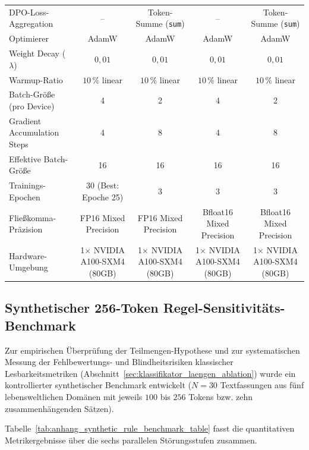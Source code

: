 \begin{table}[htbp]
{\begin{tabular}{@{}lcccc@{}}
DPO-Loss-Aggregation & -- & Token-Summe (\texttt{sum}) & -- & Token-Summe (\texttt{sum}) \\
Optimierer & AdamW & AdamW & AdamW & AdamW \\
Weight Decay ($\lambda$) & $0{,}01$ & $0{,}01$ & $0{,}01$ & $0{,}01$ \\
Warmup-Ratio & $10\,\%$ linear & $10\,\%$ linear & $10\,\%$ linear & $10\,\%$ linear \\
Batch-Größe (pro Device) & 4 & 2 & 4 & 2 \\
Gradient Accumulation Steps & 4 & 8 & 4 & 8 \\
Effektive Batch-Größe & 16 & 16 & 16 & 16 \\
Trainings-Epochen & 30 (Best: Epoche 25) & 3 & 3 & 3 \\
Fließkomma-Präzision & FP16 Mixed Precision & FP16 Mixed Precision & Bfloat16 Mixed Precision & Bfloat16 Mixed Precision \\
Hardware-Umgebung & 1$\times$ NVIDIA A100-SXM4 (80GB) & 1$\times$ NVIDIA A100-SXM4 (80GB) & 1$\times$ NVIDIA A100-SXM4 (80GB) & 1$\times$ NVIDIA A100-SXM4 (80GB) \\
\bottomrule
\end{tabular}}
\end{table}

\newpage
\subsection{Synthetischer 256-Token Regel-Sensitivitäts-Benchmark}
\label{sec:anhang_synthetic_rule_benchmark}

Zur empirischen Überprüfung der Teilmengen-Hypothese und zur systematischen Messung der Fehlbewertungs- und Blindheitsrisiken klassischer Lesbarkeitsmetriken (Abschnitt~\ref{sec:klassifikator_laengen_ablation}) wurde ein kontrollierter synthetischer Benchmark entwickelt ($N = 30$ Textfassungen aus fünf lebensweltlichen Domänen mit jeweils $100$ bis $256$ Tokens bzw. zehn zusammenhängenden Sätzen).

Tabelle~\ref{tab:anhang_synthetic_rule_benchmark_table} fasst die quantitativen Metrikergebnisse über die sechs parallelen Störungsstufen zusammen.

